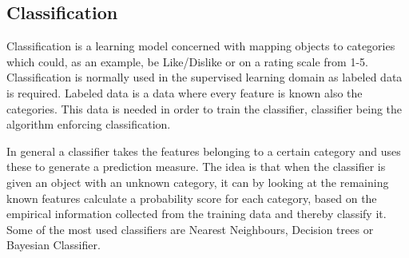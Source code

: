\subsection{Classification}
Classification is a learning model concerned with mapping objects to categories which could, as an example, be Like/Dislike or on a rating scale from 1-5. Classification is normally used in the supervised learning domain as labeled data is required. Labeled data is a data where every feature is known also the categories. This data is needed in order to train the classifier, classifier being the algorithm enforcing classification. 

In general a classifier takes the features belonging to a certain category and uses these to generate a prediction measure. The idea is that when the classifier is given an object with an unknown category, it can by looking at the remaining known features calculate a probability score for each category, based on the empirical information collected from the training data and thereby classify it. Some of the most used classifiers are Nearest Neighbours, Decision trees or Bayesian Classifier. 